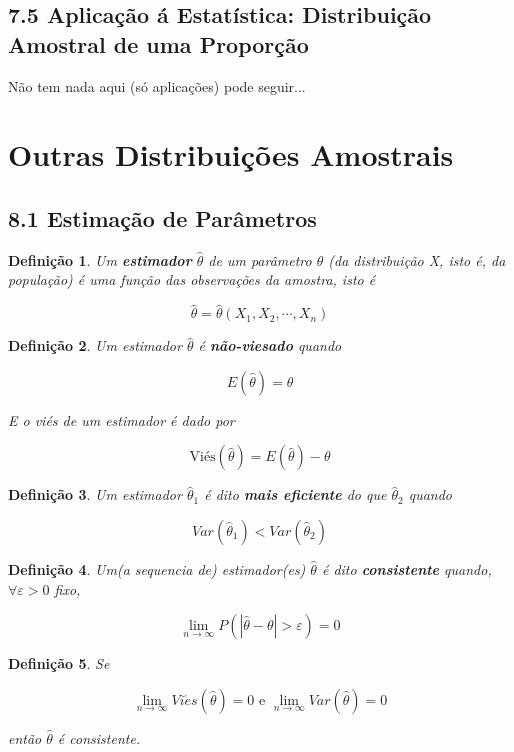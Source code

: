 \documentclass[12pt]{article}
\newtheorem{definition}{Definição}
\begin{document}
\subsection*{7.5 Aplicação á Estatística: Distribuição Amostral de uma Proporção}

Não tem nada aqui (só aplicações) pode seguir...

\section{Outras Distribuições Amostrais}
\subsection*{8.1 Estimação de Parâmetros}

\begin{definition}
    Um \textbf{estimador} $\hat{\theta}$ de um parâmetro $\theta$ (da distribuição X, isto é, da população) é uma função das observações da amostra, isto é
    
    $$\hat{\theta} = \hat{\theta}(X_1, X_2, \cdots, X_n)$$
\end{definition}

\begin{definition}
    Um estimador $\hat{\theta}$ é \textbf{não-viesado} quando
    
    $$E(\hat{\theta}) = \theta$$
    
    E o viés de um estimador é dado por
    
    $$\text{Viés} (\hat{\theta}) = E(\hat{\theta}) - \theta$$
\end{definition}

\begin{definition}
    Um estimador $\hat{\theta}_1$ é dito \textbf{mais eficiente} do que $\hat{\theta}_2$ quando
    
    $$Var(\hat{\theta}_1) < Var(\hat{\theta}_2)$$
\end{definition}

\begin{definition}
    Um(a sequencia de) estimador(es) $\hat{\theta}$ é dito \textbf{consistente} quando, $\forall \varepsilon > 0$ fixo,
    
    $$\lim_{n \rightarrow \infty} P(|\hat{\theta} - \theta| > \varepsilon) = 0$$
\end{definition}

\begin{definition}
    Se 
    
    $$\lim_{n \rightarrow \infty} Vi\acute{e}s(\hat{\theta}) = 0 \text{ e } \lim_{n \rightarrow \infty} Var(\hat{\theta}) = 0$$
    
    então $\hat{\theta}$ é consistente.
\end{definition}
\end{document}
